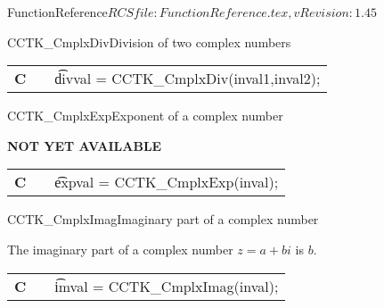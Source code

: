 \begin{cactuspart}{5}{FunctionReference}{$RCSfile: FunctionReference.tex,v $}{$Revision: 1.45 $}
\begin{CCTKFunc}{CCTK\_CmplxDiv}{Division of two complex numbers}
\label{CCTK-CmplxDiv}
\showcargs
\begin{params}
\end{params}
\begin{discussion}
\end{discussion}
\begin{examples}
\begin{tabular}{@{}p{3cm}cp{11cm}}
\hfill {\bf C} && {\t divval = CCTK\_CmplxDiv(inval1,inval2)};
\end{tabular}
\end{examples}
\begin{errorcodes}
\end{errorcodes}
\end{CCTKFunc}


\begin{CCTKFunc}{CCTK\_CmplxExp}{Exponent of a complex number}
\label{CCTK-CmplxExp}
\showcargs
\begin{params}
\end{params}
\begin{discussion}
{\bf NOT YET AVAILABLE}
\end{discussion}
\begin{examples}
\begin{tabular}{@{}p{3cm}cp{11cm}}
\hfill {\bf C} && {\t expval = CCTK\_CmplxExp(inval)};
\end{tabular}
\end{examples}
\begin{errorcodes}
\end{errorcodes}
\end{CCTKFunc}

\begin{CCTKFunc}{CCTK\_CmplxImag}{Imaginary part of a complex number}
\label{CCTK-CmplxImag}
\showcargs
\begin{params}
\end{params}
\begin{discussion}
The imaginary part of a complex number $z=a+bi$ is $b$.
\end{discussion}
\begin{examples}
\begin{tabular}{@{}p{3cm}cp{11cm}}
\hfill {\bf C} && {\t imval = CCTK\_CmplxImag(inval)};
\end{tabular}
\end{examples}
\begin{errorcodes}
\end{errorcodes}
\end{CCTKFunc}


\end{cactuspart}
